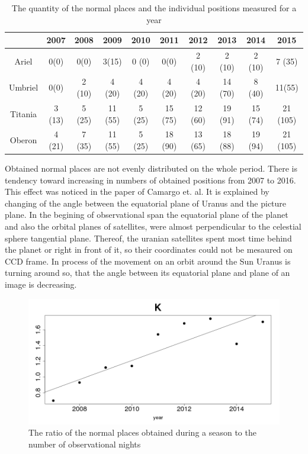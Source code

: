 \documentclass[]{article}
\begin{document}
\begin{table}
\caption{The quantity of the normal places and the individual positions measured for a year}
\label{number_of_points}
\begin{center}
\begin{tabular}{|c|c|c|c|c|c|c|c|c|c|}
\hline
 & 2007 & 2008 & 2009 & 2010 & 2011 & 2012 & 2013 & 2014 & 2015\\
\hline
Ariel & 0(0) & 0(0) & 3(15) & 0 (0) & 0(0) & 2 (10) & 2 (10) & 2 (10) & 7 (35)\\
Umbriel & 0(0) & 2 (10) & 4 (20) & 4 (20) & 4 (20) & 4 (20) & 14 (70) & 8 (40) & 11(55)\\
Titania & 3 (13) & 5 (25) & 11 (55) & 5 (25) & 15 (75) & 12 (60) & 19 (91) & 15 (74) & 21 (105)\\
Oberon & 4 (21) & 7 (35) & 11 (55) & 5 (25) & 18 (90) & 13 (65) & 18 (88) & 19 (94) & 21 (105) \\
\hline
\end{tabular}
\end{center}
\end{table}
Obtained normal places are not evenly distributed on the whole period. There is tendency toward increasing in numbers of obtained positions from 2007 to 2016. This effect was noticed in the paper of Camargo et. al. \cite{2} It is explained by changing of the angle between the equatorial plane of Uranus and the picture plane. In the begining of observational span the equatorial plane of the planet and also the orbital planes of satellites, were almost perpendicular to the celestial sphere tangential plane. Thereof, the uranian satellites spent most time behind the planet or right in front of it, so their coordinates could not be mesaured on CCD frame. In process of the movement on an orbit around the Sun Uranus is turning around so, that the angle between its equatorial plane and plane of an image is decreasing.
\begin{figure} 
\vspace{-4ex}
\includegraphics[width=\linewidth]{K}
\caption{The ratio of the normal places obtained during a season to the number of observational nights}
\label{fig:K}
\end{figure}
\end{document}
